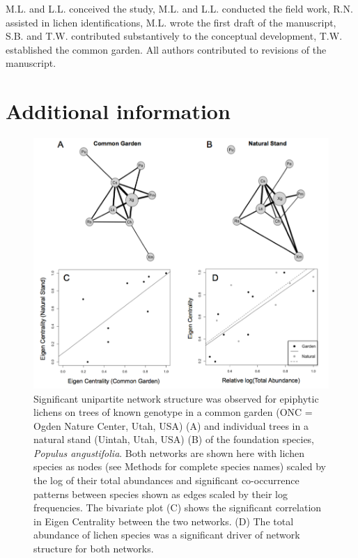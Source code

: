 \documentclass[fleqn,10pt]{wlscirep}
\begin{document}
M.L. and L.L. conceived the study, M.L. and L.L. conducted the field
work, R.N.  assisted in lichen identifications, M.L. wrote the first
draft of the manuscript, S.B. and T.W. contributed substantively to
the conceptual development, T.W. established the common garden. All
authors contributed to revisions of the manuscript.

\section*{Additional information}




\clearpage
\newpage

\begin{figure}[ht]
\centering
\includegraphics[width=\linewidth]{fig1}
\caption{Significant unipartite network structure was observed for
  epiphytic lichens on trees of known genotype in a common garden (ONC
  = Ogden Nature Center, Utah, USA) (A) and individual trees in a
  natural stand (Uintah, Utah, USA) (B) of the foundation species,
  \textit{Populus angustifolia}. Both networks are shown here with
  lichen species as nodes (see Methods for complete species names)
  scaled by the log of their total abundances and significant
  co-occurrence patterns between species shown as edges scaled by
  their log frequencies. The bivariate plot (C) shows the significant
  correlation in Eigen Centrality between the two networks. (D) The
  total abundance of lichen species was a significant driver of
  network structure for both networks.}
\label{fig:fig1}
\end{figure}
\end{document}
